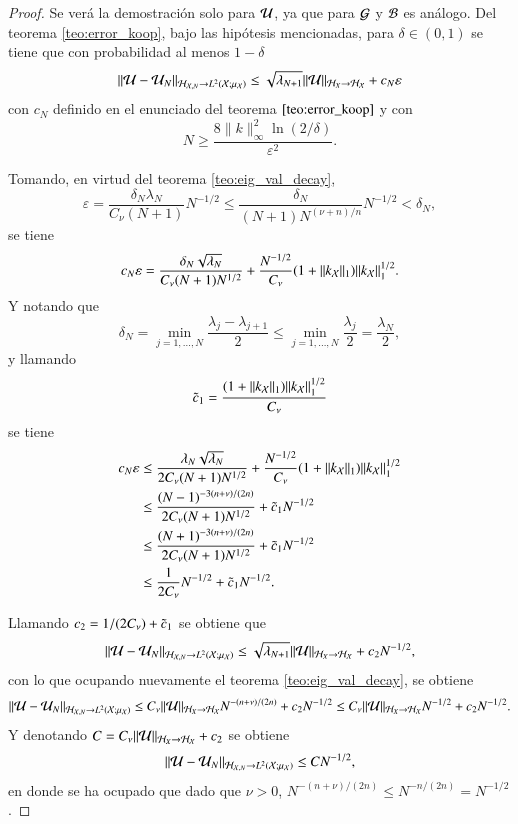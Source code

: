 \begin{proof}
    Se verá la demostración solo para $\mathcal{U}$, ya que para $\mathcal{G}$ y $\mathcal{B}$ es análogo. Del teorema \ref{teo:error_koop}, bajo las hipótesis mencionadas, para $\delta \in (0, 1)$ se tiene que con probabilidad al menos $1-\delta$
    \[
    \|\mathcal{U} - \mathcal{U}_N \|_{\mathcal{H}_{\mathcal{X}, N} \to L^2(\mathcal{X}; \mu_{\mathcal{X}})} \leq \sqrt{\lambda_{N+1}} \|\mathcal{U} \|_{\mathcal{H}_{X} \to \mathcal{H_{\mathcal{X}}}} + c_N \varepsilon
    \]
    con $c_N$ definido en el enunciado del teorema $\ref{teo:error_koop}$ y con 
    \begin{equation}
        N \geq \frac{8\|k\|^2_\infty \ln(2/\delta)}{\varepsilon^2}.
        \label{eq:N_bound}
    \end{equation}

    Tomando, en virtud del teorema \ref{teo:eig_val_decay}, 
    \[
    \varepsilon = \frac{\delta_N \lambda_N}{C_\nu(N+1)} N^{-1/2} \leq \frac{\delta_N}{(N+1)N^{(\nu+n)/n}} N^{-1/2} <\delta_N,
    \]
    se tiene
    \[
    c_N \varepsilon = \frac{\delta_N \sqrt{\lambda_N}}{C_\nu (N+1) N^{1/2}} + \frac{N^{-1/2}}{C_\nu} (1 + \|k_{\mathcal{X}}\|_{1}) \|k_{\mathcal{X}} \|^{1/2}_{1}.
    \]
    Y notando que 
    \[
    \delta_N = \min_{j=1, \dots, N} \frac{\lambda_j - \lambda_{j+1}}{2} \leq \min_{j=1, \dots, N} \frac{\lambda_j}{2} = \frac{\lambda_N}{2},
    \]
    y llamando
    \[
    \Tilde{c}_1 = \frac{(1 + \|k_{\mathcal{X}}\|_{1}) \|k_{\mathcal{X}} \|^{1/2}_{1}}{C_\nu}
    \]
    se tiene
    \begingroup
    \allowdisplaybreaks
    \begin{align*}
        c_N \varepsilon & \leq  \frac{\lambda_N \sqrt{\lambda_N}}{2 C_\nu (N+1) N^{1/2}} + \frac{N^{-1/2}}{C_\nu} (1 + \|k_{\mathcal{X}}\|_{1}) \|k_{\mathcal{X}} \|^{1/2}_{1} \\ 
        & \leq \frac{(N-1)^{-3(n+\nu)/(2n)}}{2 C_\nu (N+1) N^{1/2}} + \Tilde{c}_1 N^{-1/2} \\
        & \leq \frac{(N+1)^{-3(n+\nu)/(2n)}}{2 C_\nu (N+1) N^{1/2}} + \Tilde{c}_1 N^{-1/2} \\
        & \leq \frac{1}{2C_\nu} N^{-1/2} + \Tilde{c}_1 N^{-1/2}.
    \end{align*}
    \endgroup
    
    Llamando $c_2 = 1/(2C_\nu) + \Tilde{c}_1$ se obtiene que 
    \[
    \|\mathcal{U} - \mathcal{U}_N \|_{\mathcal{H}_{\mathcal{X}, N} \to L^2(\mathcal{X}; \mu_{\mathcal{X}})} \leq \sqrt{\lambda_{N+1}} \|\mathcal{U} \|_{\mathcal{H}_{X} \to \mathcal{H_{\mathcal{X}}}} + c_2 N^{-1/2},
    \]
    con lo que ocupando nuevamente el teorema \ref{teo:eig_val_decay}, se obtiene
    \[
    \|\mathcal{U} - \mathcal{U}_N \|_{\mathcal{H}_{\mathcal{X}, N} \to L^2(\mathcal{X}; \mu_{\mathcal{X}})} \leq C_\nu \|\mathcal{U} \|_{\mathcal{H}_{X} \to \mathcal{H_{\mathcal{X}}}} N^{-(n+\nu)/(2n)} + c_2 N^{-1/2} \leq C_\nu \|\mathcal{U} \|_{\mathcal{H}_{X} \to \mathcal{H_{\mathcal{X}}}} N^{-1/2} + c_2 N^{-1/2}.
    \]
    Y denotando $C = C_\nu \|\mathcal{U} \|_{\mathcal{H}_{X} \to \mathcal{H_{\mathcal{X}}}} + c_2$ se obtiene 
    \[
    \|\mathcal{U} - \mathcal{U}_N \|_{\mathcal{H}_{\mathcal{X}, N} \to L^2(\mathcal{X}; \mu_{\mathcal{X}})} \leq C N^{-1/2},
    \]
    en donde se ha ocupado que dado que $\nu > 0$, $N^{-(n+\nu)/(2n)} \leq N^{-n/(2n)} = N^{-1/2}$.


\end{proof}
